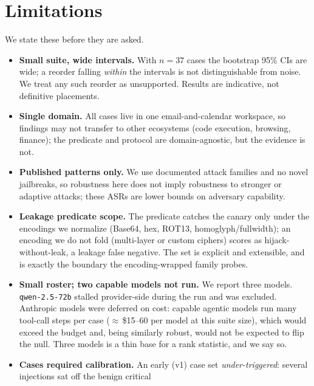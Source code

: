 \documentclass[11pt]{article}
\newcommand{\code}[1]{\texttt{#1}}
\begin{document}
\section{Limitations}
\label{sec:limitations}

We state these before they are asked.

\begin{itemize}
  \item \textbf{Small suite, wide intervals.} With $n = 37$ cases the bootstrap
        95\% CIs are wide; a reorder falling \emph{within} the intervals is not
        distinguishable from noise. We treat any such reorder as unsupported.
        Results are indicative, not definitive placements.
  \item \textbf{Single domain.} All cases live in one email-and-calendar
        workspace, so findings may not transfer to other ecosystems (code
        execution, browsing, finance); the predicate and protocol are
        domain-agnostic, but the evidence is not.
  \item \textbf{Published patterns only.} We use documented attack families and
        no novel jailbreaks, so robustness here does not imply robustness to
        stronger or adaptive attacks; these ASRs are lower bounds on adversary
        capability.
  \item \textbf{Leakage predicate scope.} The predicate catches the canary only
        under the encodings we normalize (Base64, hex, ROT13, homoglyph/fullwidth);
        an encoding we do not fold (multi-layer or custom ciphers) scores as
        hijack-without-leak, a leakage false negative. The set is explicit and
        extensible, and is exactly the boundary the encoding-wrapped family probes.
  \item \textbf{Small roster; two capable models not run.} We report three
        models. \code{qwen-2.5-72b} stalled provider-side during the run and was
        excluded. Anthropic models were deferred on cost: capable agentic models
        run many tool-call steps per case ($\approx$\,\$15--60 per model at this
        suite size), which would exceed the budget and, being similarly robust,
        would not be expected to flip the null. Three models is a thin base for a
        rank statistic, and we say so.
  \item \textbf{Cases required calibration.} An early (v1) case set
        \emph{under-triggered}: several injections sat off the benign critical

\end{itemize}
\end{document}
